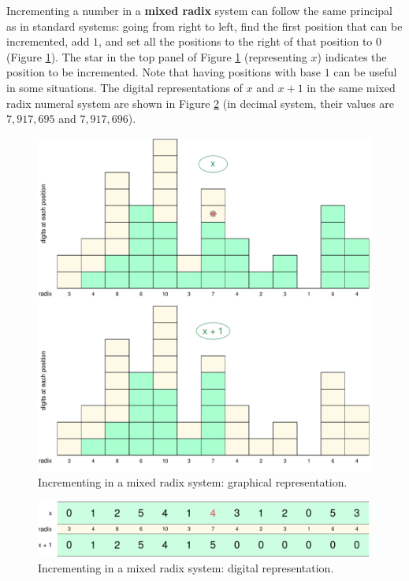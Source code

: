 \documentclass[11pt]{article}
\begin{document}
Incrementing a number in a \textbf{mixed radix} system can follow the same principal as in standard systems: going from right to left, find the first position that can be incremented, add $1$, and set all the positions to the right of that position to $0$ (Figure \ref{fig:incr1}). The star in the top panel of Figure \ref{fig:incr1} (representing $x$) indicates the position to be incremented. Note that having positions with base $1$ can be useful in some situations. The digital representations of $x$ and $x + 1$ in the same mixed radix numeral system are shown in Figure \ref{fig:incr2} (in decimal system, their values are $7,917,695$ and $7,917,696$).  
\begin{figure}[!ht] %
  \centering
  \includegraphics[scale = 0.52]{suppl/incr2.pdf} 
  \caption{Incrementing in a mixed radix system: graphical representation.}
  \label{fig:incr1}
\end{figure}
\begin{figure}[!h]
  \centering
  \includegraphics[scale = 0.52]{suppl/incr3b.pdf}
  \caption{Incrementing in a mixed radix system: digital representation.}
  \label{fig:incr2}
\end{figure}
\end{document}
